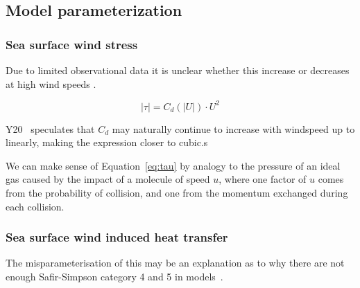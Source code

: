 \subsection{Model parameterization}
\subsubsection{Sea surface wind stress}

Due to limited observational data
it is unclear whether this increase or decreases at high wind speeds
\cite{powell2003reduced, donelan2004limiting}.


\begin{equation}
 |\tau| = C_d(|U|) \cdot U^2
 \label{eq:tau}
 \end{equation}

Y20~\cite{ZannaPreprint} speculates that $C_d$ may naturally continue
to increase with windspeed up to linearly, making the expression
closer to cubic.s

We can make sense of Equation~\ref{eq:tau} by analogy to the pressure of an ideal
gas caused by the impact of a molecule of speed $u$, where one factor of
$u$ comes from the probability of collision, and one from the momentum
exchanged during each collision.

\subsubsection{Sea surface wind induced heat transfer}
The misparameterisation of this may be an explanation as to why there are
not enough Safir-Simpson category 4 and 5 in models~\cite{emanuel2005divine}.



